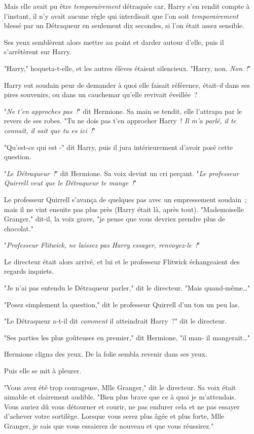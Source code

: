 Mais elle avait pu être \emph{temporairement} détraquée car, Harry s'en rendit compte à l'instant, il n'y avait aucune règle qui interdisait que l'on soit \emph{temporairement} blessé par un Détraqueur en seulement dix secondes, si l'on était assez sensible.

Ses yeux semblèrent alors mettre au point et darder autour d'elle, puis il s'arrêtèrent sur Harry.

"Harry," hoqueta-t-elle, et les autres élèves étaient silencieux. "Harry, non. \emph{Non~!}"

Harry eut soudain peur de demander à quoi elle faisait référence, était-\emph{il} dans ses pires souvenirs, ou dans un cauchemar qu'elle revivait éveillée~?

"\emph{Ne t'en approches pas~!}" dit Hermione. Sa main se tendit, elle l'attrapa par le revers de ses robes. "Tu ne dois pas t'en approcher Harry~! \emph{Il m'a parlé, il te connaît, il sait que tu es ici~!}"

"Qu'est-ce qui est -" dit Harry, puis il jura intérieurement d'avoir posé cette question.

"\emph{Le Détraqueur~!}" dit Hermione. Sa voix devint un cri perçant. "\emph{Le professeur Quirrell veut que le Détraqueur te mange~!}"

Le professeur Quirrell s'avança de quelques pas avec un empressement soudain~; mais il ne vint ensuite pas plus près (Harry était là, après tout). "Mademoiselle Granger," dit-il, la voix grave, "je pense que vous devriez prendre plus de chocolat."

"\emph{Professeur Flitwick, ne laissez pas Harry essayer, renvoyez-le~!}"

Le directeur était alors arrivé, et lui et le professeur Flitwick échangeaient des regards inquiets.

"Je n'ai pas entendu le Détraqueur parler," dit le directeur. "Mais quand-même…"

"Posez simplement la question," dit le professeur Quirrell d'un ton un peu las.

"Le Détraqueur a-t-il dit \emph{comment} il atteindrait Harry~?" dit le directeur.

"Ses parties les plus goûteuses en premier," dit Hermione, "il man- il mangerait…"

Hermione cligna des yeux. De la folie sembla revenir dans ses yeux.

Puis elle se mit à pleurer.

"Vous avez été trop courageuse, Mlle Granger," dit le directeur. Sa voix était aimable et clairement audible. "Bien plus brave que ce à quoi je m'attendais. Vous auriez dû vous détourner et courir, ne pas endurer cela et ne pas essayer d'achever votre sortilège. Lorsque vous serez plus âgée et plus forte, Mlle Granger, je sais que vous essaierez de nouveau et que vous réussirez."

